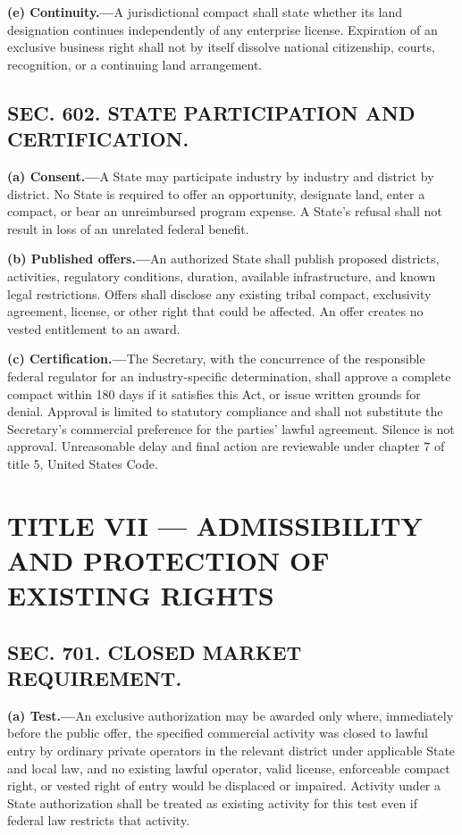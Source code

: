\documentclass[12pt,letterpaper]{article}
\begin{document}
\textbf{(e) Continuity.---}A jurisdictional compact shall state whether its land designation continues independently of any enterprise license. Expiration of an exclusive business right shall not by itself dissolve national citizenship, courts, recognition, or a continuing land arrangement.

\subsection*{SEC. 602. STATE PARTICIPATION AND CERTIFICATION.}

\textbf{(a) Consent.---}A State may participate industry by industry and district by district. No State is required to offer an opportunity, designate land, enter a compact, or bear an unreimbursed program expense. A State's refusal shall not result in loss of an unrelated federal benefit.

\textbf{(b) Published offers.---}An authorized State shall publish proposed districts, activities, regulatory conditions, duration, available infrastructure, and known legal restrictions. Offers shall disclose any existing tribal compact, exclusivity agreement, license, or other right that could be affected. An offer creates no vested entitlement to an award.

\textbf{(c) Certification.---}The Secretary, with the concurrence of the responsible federal regulator for an industry-specific determination, shall approve a complete compact within 180 days if it satisfies this Act, or issue written grounds for denial. Approval is limited to statutory compliance and shall not substitute the Secretary's commercial preference for the parties' lawful agreement. Silence is not approval. Unreasonable delay and final action are reviewable under chapter 7 of title 5, United States Code.

\section*{TITLE VII --- ADMISSIBILITY AND PROTECTION OF EXISTING RIGHTS}

\subsection*{SEC. 701. CLOSED MARKET REQUIREMENT.}

\textbf{(a) Test.---}An exclusive authorization may be awarded only where, immediately before the public offer, the specified commercial activity was closed to lawful entry by ordinary private operators in the relevant district under applicable State and local law, and no existing lawful operator, valid license, enforceable compact right, or vested right of entry would be displaced or impaired. Activity under a State authorization shall be treated as existing activity for this test even if federal law restricts that activity.
\end{document}
